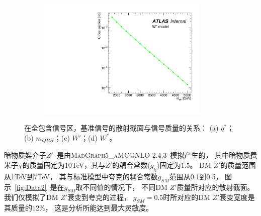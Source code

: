 \begin{figure}[htbp]
\begin{subfigure}{.5\textwidth}
   \caption{}
   \label{fig:WPrime}
  \end{subfigure}
  \begin{subfigure}{.5\textwidth}
  \centering
   \includegraphics[width=0.9\textwidth]{figuresDijet/03-BenchmarkSignals/Xsec_Wstar.pdf}
   \caption{}
   \label{fig:WStar}
  \end{subfigure}
  \caption{
在全包含信号区，基准信号的散射截面与信号质量的关系：
  (a) $q^*$；(b) $m_{QBH}$；(c) $W\prime$；(d) $W^*$。
  }
  \label{fig:Data1}
\end{figure} 


暗物质媒介子$Z\prime$~\cite{DM3}是由\textsc{MadGraph5\_aMC@NLO 2.4.3}~\cite{Alwall:2014hca}模拟产生的，
其中暗物质费米子$\chi$的质量固定为10TeV，其与$Z\prime$的耦合常数($g_\chi$)固定为$1.5$。
DM $Z\prime$的质量范围从1TeV到7TeV，
其与标准模型中夸克的耦合常数$g_{SM}$范围从0.1到0.5，
图示~\ref{fig:Data2}~是在$g_{SM}$取不同值的情况下，
不同DM $Z\prime$质量所对应的散射截面。
我们仅模拟了DM $Z\prime$衰变到夸克的过程，
$g_{SM}=0.5$时所对应的DM $Z\prime$衰变宽度是其质量的$12\%$，
这是分析所能达到最大灵敏度。

